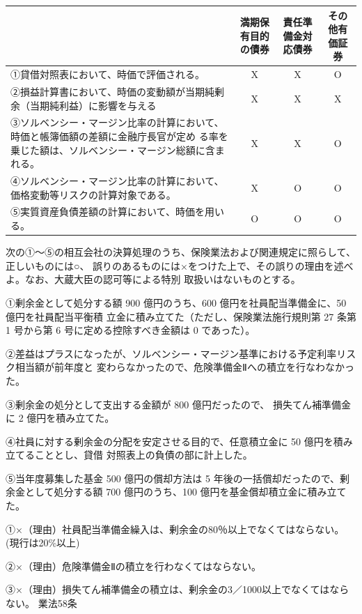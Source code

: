 \documentclass[report,gutter=10mm,fore-edge=10mm,uplatex,dvipdfmx]{jlreq}
\begin{document}
\answer{}

\begin{tabularx}{\textwidth}{|X|c|c|c|}
\hline
 & 満期保有目的の債券&責任準備金対応債券&その他有価証券 \\ \hline
①貸借対照表において、時価で評価される。 & X & X&O \\ \hline
②損益計算書において、時価の変動額が当期純剰余（当期純利益）に影響を与える& X&X &X \\ \hline
③ソルベンシー・マージン比率の計算において、時価と帳簿価額の差額に金融庁長官が定め
る率を乗じた額は、ソルベンシー・マージン総額に含まれる。&X &X &O \\ \hline
④ソルベンシー・マージン比率の計算において、価格変動等リスクの計算対象である。& X&O &O \\ \hline
⑤実質資産負債差額の計算において、時価を用いる。&O &O &O \\ \hline
\end{tabularx}

次の①～⑤の相互会社の決算処理のうち、保険業法および関連規定に照らして、正しいものには○、
誤りのあるものには×をつけた上で、その誤りの理由を述べよ。なお、大蔵大臣の認可等による特別
取扱いはないものとする。

①剰余金として処分する額 900 億円のうち、600 億円を社員配当準備金に、50 億円を社員配当平衡積
立金に積み立てた（ただし、保険業法施行規則第 27 条第 1 号から第 6 号に定める控除すべき金額は
0 であった）。

②差益はプラスになったが、ソルベンシー・マージン基準における予定利率リスク相当額が前年度と
変わらなかったので、危険準備金Ⅱへの積立を行なわなかった。

③剰余金の処分として支出する金額が 800 億円だったので、
損失てん補準備金に 2 億円を積み立てた。

④社員に対する剰余金の分配を安定させる目的で、任意積立金に 50 億円を積み立てることとし、貸借
対照表上の負債の部に計上した。

⑤当年度募集した基金 500 億円の償却方法は 5 年後の一括償却だったので、剰余金として処分する額
700 億円のうち、100 億円を基金償却積立金に積み立てた。

\answer{}

①×（理由）社員配当準備金繰入は、剰余金の80％以上でなくてはならない。
(現行は20\%以上)

②×（理由）危険準備金Ⅱの積立を行わなくてはならない。

③×（理由）損失てん補準備金の積立は、剰余金の3／1000以上でなくてはならない。
業法58条
\end{document}
